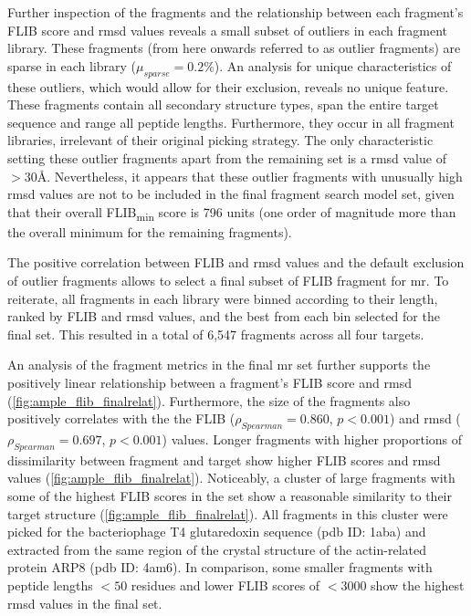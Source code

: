Further inspection of the fragments and the relationship between each fragment's FLIB score and \gls{rmsd} values reveals a small subset of outliers in each fragment library. These fragments (from here onwards referred to as outlier fragments) are sparse in each library ($\mu_{sparse}=0.2$\%). An analysis for unique characteristics of these outliers, which would allow for their exclusion, reveals no unique feature. These fragments contain all secondary structure types, span the entire target sequence and range all peptide lengths. Furthermore, they occur in all fragment libraries, irrelevant of their original picking strategy. The only characteristic setting these outlier fragments apart from the remaining set is a \gls{rmsd} value of $>30$\AA. Nevertheless, it appears that these outlier fragments with unusually high \gls{rmsd} values are not to be included in the final fragment search model set, given that their overall FLIB\textsubscript{min} score is 796 units (one order of magnitude more than the overall minimum for the remaining fragments).

The positive correlation between FLIB and \gls{rmsd} values and the default exclusion of outlier fragments allows to select a final subset of FLIB fragment for \gls{mr}. To reiterate, all fragments in each library were binned according to their length, ranked by FLIB and \gls{rmsd} values, and the best from each bin selected for the final set. This resulted in a total of 6,547 fragments across all four targets.

An analysis of the fragment metrics in the final \gls{mr} set further supports the positively linear relationship between a fragment's FLIB score and \gls{rmsd} (\cref{fig:ample_flib_finalrelat}). Furthermore, the size of the fragments also positively correlates with the the FLIB ($\rho_{Spearman}=0.860$, $p<0.001$) and \gls{rmsd} ($\rho_{Spearman}=0.697$, $p<0.001$) values. Longer fragments with higher proportions of dissimilarity between fragment and target show higher FLIB scores and \gls{rmsd} values (\cref{fig:ample_flib_finalrelat}). Noticeably, a cluster of large fragments with some of the highest FLIB scores in the set show a reasonable similarity to their target structure (\cref{fig:ample_flib_finalrelat}). All fragments in this cluster were picked for the bacteriophage T4 glutaredoxin sequence (\gls{pdb} ID: 1aba) and extracted from the same region of the crystal structure of the actin-related protein ARP8 (\gls{pdb} ID: 4am6). In comparison, some smaller fragments with peptide lengths $<50$ residues and lower FLIB scores of $<3000$ show the highest \gls{rmsd} values in the final set.

